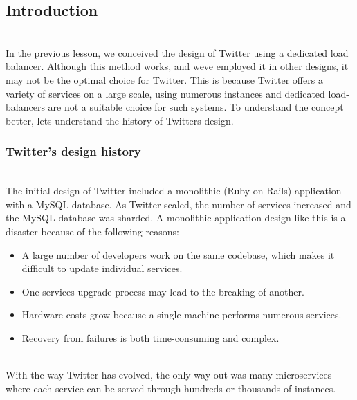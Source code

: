 

\subsection{Introduction}\label{JbRfc7UhmbNZ2R94FsEQs}
\\
In the previous lesson, we conceived the design of Twitter using a dedicated load balancer. Although this method works, and we\textquotesingle ve employed it in other designs, it may not be the optimal choice for Twitter. This is because Twitter offers a variety of services on a large scale, using numerous instances and dedicated load-balancers are not a suitable choice for such systems. To understand the concept better, let\textquotesingle s understand the history of Twitter\textquotesingle s design.

\subsubsection{Twitter's design history}\label{rGb-EhD7fPjk_qx0_Y39y}
\\
The initial design of Twitter included a monolithic (Ruby on Rails) application with a MySQL database. As Twitter scaled, the number of services increased and the MySQL database was sharded. A monolithic application design like this is a disaster because of the following reasons:

\begin{itemize}
\item
\protect{}\label{1VK8ONxxG6pHWMldLg2OK}
A large number of developers work on the same codebase, which makes it difficult to update individual services.
\item
\protect{}\label{_t5hs9iD_RQdGi0T3tkRd}
One service\textquotesingle s upgrade process may lead to the breaking of another.
\item
\protect{}\label{pGd3dx43p5wo28jTKXf17}
Hardware costs grow because a single machine performs numerous services.
\item
\protect{}\label{MF8vd_q5kb2S-WA6lJNU6}
Recovery from failures is both time-consuming and complex.
\end{itemize}
\\
With the way Twitter has evolved, the only way out was many microservices where each service can be served through hundreds or thousands of instances.

